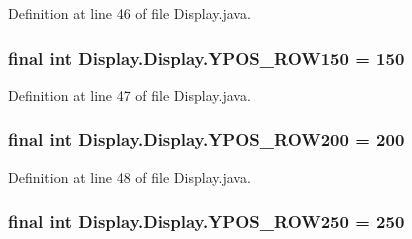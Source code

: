 Definition at line 46 of file Display.\+java.

\hypertarget{class_display_1_1_display_a38a83d9cebcb54826379194267a2ab4a}{}
\subsubsection[{Y\+P\+O\+S\+\_\+\+R\+O\+W150}]{\setlength{\rightskip}{0pt plus 5cm}final int Display.\+Display.\+Y\+P\+O\+S\+\_\+\+R\+O\+W150 = 150\hspace{0.3cm}{\ttfamily [static]}}\label{class_display_1_1_display_a38a83d9cebcb54826379194267a2ab4a}


Definition at line 47 of file Display.\+java.

\hypertarget{class_display_1_1_display_af186989bbcc82bddc811ce9727cb1d4d}{}
\subsubsection[{Y\+P\+O\+S\+\_\+\+R\+O\+W200}]{\setlength{\rightskip}{0pt plus 5cm}final int Display.\+Display.\+Y\+P\+O\+S\+\_\+\+R\+O\+W200 = 200\hspace{0.3cm}{\ttfamily [static]}}\label{class_display_1_1_display_af186989bbcc82bddc811ce9727cb1d4d}


Definition at line 48 of file Display.\+java.

\hypertarget{class_display_1_1_display_a76fe305a0d851cc121da69952ee13b00}{}
\subsubsection[{Y\+P\+O\+S\+\_\+\+R\+O\+W250}]{\setlength{\rightskip}{0pt plus 5cm}final int Display.\+Display.\+Y\+P\+O\+S\+\_\+\+R\+O\+W250 = 250\hspace{0.3cm}{\ttfamily [static]}}\label{class_display_1_1_display_a76fe305a0d851cc121da69952ee13b00}



